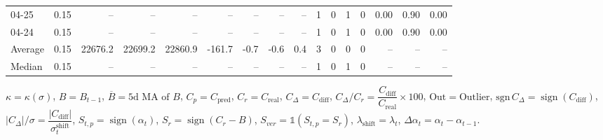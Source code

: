 \begin{threeparttable}
{\begin{tabular}{lrrrrrrrrrrrrrrr}
  04-25 &     0.15 &      -- &      -- &      -- &         -- &             -- &                       -- &                  -- &              1 &         0 &     1 &         0 &       0.00 &      0.90 &           0.00 \\
  04-24 &     0.15 &      -- &      -- &      -- &         -- &             -- &                       -- &                  -- &              1 &         0 &     1 &         0 &       0.00 &      0.90 &           0.00 \\
Average &     0.15 & 22676.2 & 22699.2 & 22860.9 &     -161.7 &           -0.7 &                     -0.6 &                 0.4 &              3 &         0 &     0 &         0 &         -- &        -- &             -- \\
 Median &     0.15 &      -- &      -- &      -- &         -- &             -- &                       -- &                  -- &              1 &         0 &     1 &         0 &         -- &        -- &             -- \\
\bottomrule
\end{tabular}
}
\begin{tablenotes}\footnotesize
\item $\kappa=\kappa(\sigma)$, $B=B_{t-1}$, $\overline{B}=\text{5d MA of }B$, $C_p=C_{\text{pred}}$, $C_r=C_{\text{real}}$, $C_\Delta=C_{\text{diff}}$, $C_\Delta/C_r=\dfrac{C_{\text{diff}}}{C_{\text{real}}}\times100$, $\mathrm{Out}=\text{Outlier}$, $\mathrm{sgn}\,C_\Delta=\operatorname{sign}(C_{\text{diff}})$, $|C_\Delta|/\sigma=\dfrac{|C_{\text{diff}}|}{\sigma_t^{\text{shift}}}$, $S_{t,p}=\operatorname{sign}(\alpha_t)$, $S_r=\operatorname{sign}(C_r - B)$, $S_{ver}=\mathbb{1}(S_{t,p}=S_r)$, $\lambda_{\text{shift}}=\lambda_t$, $\Delta\alpha_t=\alpha_t-\alpha_{t-1}$.\end{tablenotes}
\end{threeparttable}
\endgroup

